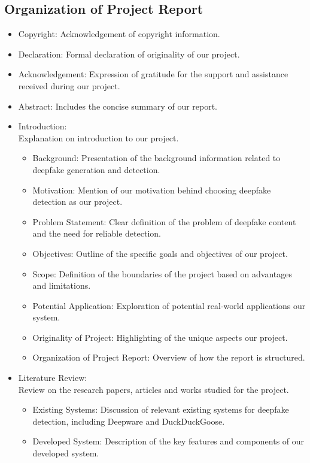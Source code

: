 \subsection{Organization of Project Report}
\begin{itemize}
    \item Copyright: Acknowledgement of copyright information.
    \item Declaration: Formal declaration of originality of our project.
    \item Acknowledgement: Expression of gratitude for the support and assistance received during our project.
    \item Abstract: Includes the concise summary of our report.
    \item Introduction:\\
    Explanation on introduction to our project.
      \begin{itemize}
        \item Background: Presentation of the background information related to deepfake generation and detection.
        \item Motivation: Mention of our motivation behind choosing deepfake detection as our project.
        \item Problem Statement: Clear definition of the problem of deepfake content and the need for reliable detection.
        \item Objectives: Outline of the specific goals and objectives of our project.
        \item Scope: Definition of the boundaries of the project based on advantages and limitations.
        \item Potential Application: Exploration of potential real-world applications our system.
        \item Originality of Project: Highlighting of the unique aspects our project.
        \item Organization of Project Report: Overview of how the report is structured.
      \end{itemize}
    \item Literature Review:\\
        Review on the research papers, articles and works studied for the project.
      \begin{itemize}
        \item Existing Systems: Discussion of relevant existing systems for deepfake detection, including Deepware and DuckDuckGoose.
        \item Developed System: Description of the key features and components of our  developed system.

\end{itemize}
\end{itemize}

